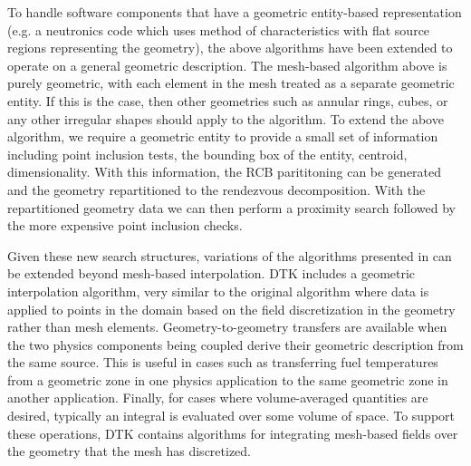 \documentclass{mc2013}
\begin{document}
\label{subsec:general_geometry}

To handle software components that have a geometric entity-based
representation (e.g. a neutronics code which uses method of
characteristics with flat source regions representing the geometry),
the above algorithms have been extended to operate on a general
geometric description. The mesh-based algorithm above is purely
geometric, with each element in the mesh treated as a separate
geometric entity. If this is the case, then other geometries such as
annular rings, cubes, or any other irregular shapes should apply to
the algorithm. To extend the above algorithm, we require a geometric
entity to provide a small set of information including point inclusion
tests, the bounding box of the entity, centroid, dimensionality. With
this information, the RCB parititoning can be generated and the
geometry repartitioned to the rendezvous decomposition. With the
repartitioned geometry data we can then perform a proximity search
followed by the more expensive point inclusion checks.

Given these new search structures, variations of the algorithms
presented in \cite{Plimpton_2004} can be extended beyond mesh-based
interpolation. DTK includes a geometric interpolation algorithm, very
similar to the original algorithm where data is applied to points in
the domain based on the field discretization in the geometry rather
than mesh elements. Geometry-to-geometry transfers are available when
the two physics components being coupled derive their geometric
description from the same source. This is useful in cases such as
transferring fuel temperatures from a geometric zone in one physics
application to the same geometric zone in another
application. Finally, for cases where volume-averaged quantities are
desired, typically an integral is evaluated over some volume of
space. To support these operations, DTK contains algorithms for
integrating mesh-based fields over the geometry that the mesh has
discretized.

\label{sec:examples}

\label{subsec:cht}

\label{subsec:cfd_neutronics}

\label{sec:scaling_study}
\end{document}
